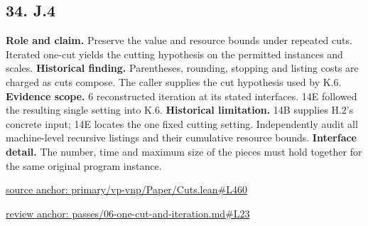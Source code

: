 \documentclass[11pt,letterpaper]{article}
\theoremstyle{definition}\newtheorem{definition}[theorem]{Definition}\newtheorem{example}[theorem]{Example}
\theoremstyle{remark}\newtheorem{remark}[theorem]{Remark}
\begin{document}
\subsection*{34. J.4}
\textbf{Role and claim.} Preserve the value and resource bounds under repeated cuts. Iterated one-cut yields the cutting hypothesis on the permitted instances and scales.
\textbf{Historical finding.} Parentheses, rounding, stopping and listing costs are charged as cuts compose. The caller supplies the cut hypothesis used by K.6.
\textbf{Evidence scope.} 6 reconstructed iteration at its stated interfaces. 14E followed the resulting single setting into K.6.
\textbf{Historical limitation.} 14B supplies H.2’s concrete input; 14E locates the one fixed cutting setting. Independently audit all machine-level recursive listings and their cumulative resource bounds.
\textbf{Interface detail.} The number, time and maximum size of the pieces must hold together for the same original program instance.
\par\href{https://github.com/nousentllc/VP-VNP-Review/blob/8a7976933b6b2b4ffda1ad3a0dfb5fc6b6f023e8/primary/vp-vnp/Paper/Cuts.lean\#L460}{source anchor: primary/vp-vnp/Paper/Cuts.lean\#L460}
\par\href{https://github.com/nousentllc/VP-VNP-Review/blob/8a7976933b6b2b4ffda1ad3a0dfb5fc6b6f023e8/passes/06-one-cut-and-iteration.md\#L23}{review anchor: passes/06-one-cut-and-iteration.md\#L23}
\goodbreak
{}
\hypertarget{claim.35}{}
\end{document}
